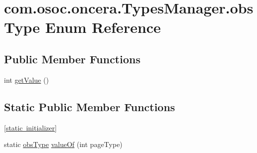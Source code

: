 \hypertarget{enumcom_1_1osoc_1_1oncera_1_1_types_manager_1_1obs_type}{}\section{com.\+osoc.\+oncera.\+Types\+Manager.\+obs\+Type Enum Reference}
\label{enumcom_1_1osoc_1_1oncera_1_1_types_manager_1_1obs_type}
\subsection*{Public Member Functions}
\begin{DoxyCompactItemize}
\item 
int \mbox{\hyperlink{enumcom_1_1osoc_1_1oncera_1_1_types_manager_1_1obs_type_a4a1abd4f74252621de532a0ec1991b0e}{get\+Value}} ()
\end{DoxyCompactItemize}
\subsection*{Static Public Member Functions}
\begin{DoxyCompactItemize}
\item 
\mbox{\hyperlink{enumcom_1_1osoc_1_1oncera_1_1_types_manager_1_1obs_type_a1a34698e0ca18dc96f28870d834511ef}{\mbox{[}static initializer\mbox{]}}}
\item 
static \mbox{\hyperlink{enumcom_1_1osoc_1_1oncera_1_1_types_manager_1_1obs_type}{obs\+Type}} \mbox{\hyperlink{enumcom_1_1osoc_1_1oncera_1_1_types_manager_1_1obs_type_ae37356fab18860f341ca57d7b97a4b55}{value\+Of}} (int page\+Type)
\end{DoxyCompactItemize}
